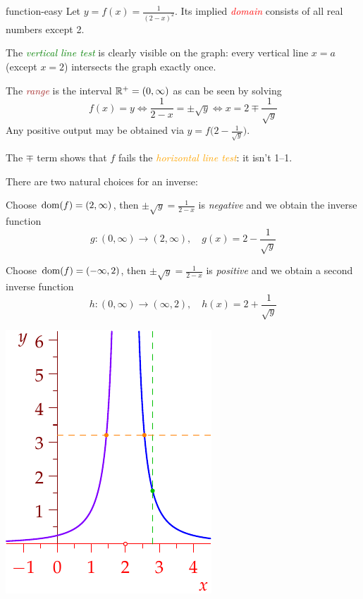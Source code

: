 \begin{example}{}{function-easy}
Let $y=f(x)=\frac 1{(2-x)^2}$. Its implied \textcolor{red}{\emph{domain}} consists of all real numbers except 2.
\begin{description}
	\begin{minipage}[t]{0.68\linewidth}\vspace{-7pt}
		\item The \textcolor{Green}{\emph{vertical line test}} is clearly visible on the graph: every vertical line $x=a$ (except $x=2$) intersects the graph exactly once.
		\item The \textcolor{Brown}{\emph{range}} is the interval $\mathbb{R}^+=(0,\infty)$ as can be seen by solving
		\[f(x)=y\iff \frac 1{2-x}=\pm \sqrt y\iff x=2\mp \frac 1{\sqrt y}\]
		Any positive output may be obtained via $y=f\bigl(2-\frac 1{\sqrt y}\bigr)$.\par
		The $\mp$ term shows that $f$ fails the \textcolor{orange}{\emph{horizontal line test}}: it isn't 1--1.
		\item There are two natural choices for an inverse:
		\begin{enumeratea}
		  \item Choose \textcolor{blue}{$\operatorname{dom}(f)=(2,\infty)$}, then $\pm\sqrt y=\frac 1{2-x}$ is \emph{negative} and we obtain the inverse function
		  \[g:(0,\infty)\to(2,\infty),\quad g(x)=2-\frac 1{\sqrt y}\] 
		  \item Choose \textcolor{Purple}{$\operatorname{dom}(f)=(-\infty,2)$}, then $\pm\sqrt y=\frac 1{2-x}$ is \emph{positive} and we obtain a second inverse function
		  \[h:(0,\infty)\to(\infty,2),\quad h(x)=2+\frac 1{\sqrt y}\] 
		\end{enumeratea}
	\end{minipage}\hfill\begin{minipage}[t]{0.31\linewidth}\vspace{-12pt}
	\flushright\includegraphics{functions-easyex1}\par

\end{minipage}
\end{description}
\end{example}
